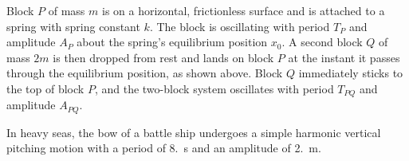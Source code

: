 \documentclass{../../../oss-ap12ibhl}
\begin{document}
\begin{questions}
  \question Block $P$ of mass $m$ is on a horizontal, frictionless surface and
  is attached to a spring with spring constant $k$. The block is oscillating
  with period $T_P$ and amplitude $A_P$ about the spring's equilibrium position
  $x_0$. A second block $Q$ of mass $2m$ is then dropped from rest and lands on
  block $P$ at the instant it passes through the equilibrium position, as shown
  above. Block $Q$ immediately sticks to the top of block $P$, and the
  two-block system oscillates with period $T_{PQ}$ and amplitude $A_{PQ}$.
  \newpage

  \question In heavy seas, the bow of a battle ship undergoes a simple harmonic
  vertical pitching motion with a period of \SI{8.}{\second} and an amplitude
  of \SI{2.}{\metre}.
\end{questions}
\end{document}
